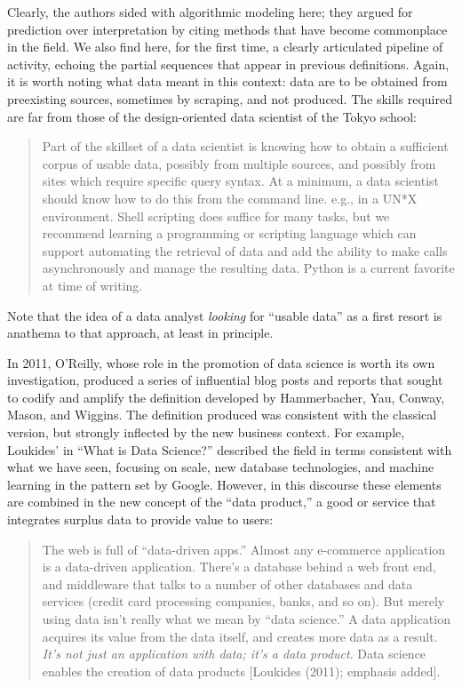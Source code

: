\documentclass[
  letterpaper,
]{report}
\begin{document}
Clearly, the authors sided with algorithmic modeling here; they argued
for prediction over interpretation by citing methods that have become
commonplace in the field. We also find here, for the first time, a
clearly articulated pipeline of activity, echoing the partial sequences
that appear in previous definitions. Again, it is worth noting what data
meant in this context: data are to be obtained from preexisting sources,
sometimes by scraping, and not produced. The skills required are far
from those of the design-oriented data scientist of the Tokyo school:

\begin{quote}
Part of the skillset of a data scientist is knowing how to obtain a
sufficient corpus of usable data, possibly from multiple sources, and
possibly from sites which require specific query syntax. At a minimum, a
data scientist should know how to do this from the command line. e.g.,
in a UN*X environment. Shell scripting does suffice for many tasks, but
we recommend learning a programming or scripting language which can
support automating the retrieval of data and add the ability to make
calls asynchronously and manage the resulting data. Python is a current
favorite at time of writing.
\end{quote}

Note that the idea of a data analyst \emph{looking} for ``usable data''
as a first resort is anathema to that approach, at least in principle.

In 2011, O'Reilly, whose role in the promotion of data science is worth
its own investigation, produced a series of influential blog posts and
reports that sought to codify and amplify the definition developed by
Hammerbacher, Yau, Conway, Mason, and Wiggins. The definition produced
was consistent with the classical version, but strongly inflected by the
new business context. For example, Loukides' in ``What is Data
Science?'' described the field in terms consistent with what we have
seen, focusing on scale, new database technologies, and machine learning
in the pattern set by Google. However, in this discourse these elements
are combined in the new concept of the ``data product,'' a good or
service that integrates surplus data to provide value to users:

\begin{quote}
The web is full of ``data-driven apps.'' Almost any e-commerce
application is a data-driven application. There's a database behind a
web front end, and middleware that talks to a number of other databases
and data services (credit card processing companies, banks, and so on).
But merely using data isn't really what we mean by ``data science.'' A
data application acquires its value from the data itself, and creates
more data as a result. \emph{It's not just an application with data;
it's a data product}. Data science enables the creation of data products
{[}Loukides (2011); emphasis added{]}.
\end{quote}
\end{document}
